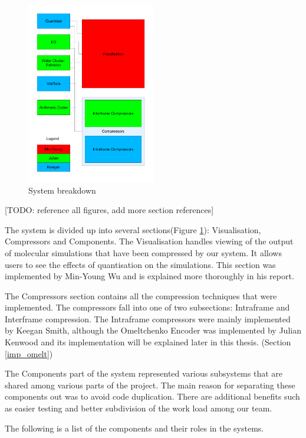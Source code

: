 \documentclass[a4paper,11pt]{report}
\begin{document}
\begin{figure}[h]
 \center
 \includegraphics[width=0.5\textwidth]{resources/Breakdown-connect.pdf}
\caption{System breakdown}
\label{sysbreak}
\end{figure}

[TODO: reference all figures, add more section references]

The system is divided up into several sections(Figure \ref{sysbreak}): Visualisation, Compressors and Components. The Visualisation handles viewing of the output of molecular simulations that have been compressed by our system. It allows users to see the effects of quantisation on the simulations. This section was implemented by Min-Young Wu and is explained more thoroughly in his report. 

The Compressors section contains all the compression techniques that were implemented. The compressors fall into one of two subsections: Intraframe and Interframe compression. The Intraframe compressors were mainly implemented by Keegan Smith, although the Omeltchenko Encoder was implemented by Julian Kenwood and its implementation will be explained later in this thesis. (Section \ref{imp_omelt})

The Components part of the system represented various subsystems that are shared among various parts of the project. The main reason for separating these components out was to avoid code duplication. There are additional benefits such as easier testing and better subdivision of the work load among our team.

The following is a list of the components and their roles in the systems. \\ \\ \\
\end{document}

